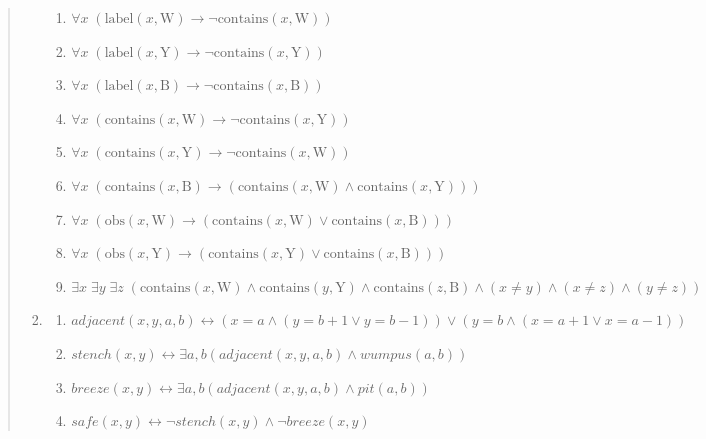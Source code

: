 \documentclass{article}
\theoremstyle{definition}
\newcommand{\<}{\langle}
\renewcommand{\>}{\rangle}
\begin{document}
\begin{enumerate}[label=\textbf{\arabic*.}]
\begin{quote}
\begin{enumerate}
      \begin{enumerate}
\item $\forall x \; (\text{label}(x, \text{W}) \rightarrow \lnot \text{contains}(x, \text{W}))$
\item $\forall x \; (\text{label}(x, \text{Y}) \rightarrow \lnot \text{contains}(x, \text{Y}))$
\item $\forall x \; (\text{label}(x, \text{B}) \rightarrow \lnot \text{contains}(x, \text{B}))$
\item $\forall x \; (\text{contains}(x, \text{W}) \rightarrow \lnot \text{contains}(x, \text{Y}))$
\item $\forall x \; (\text{contains}(x, \text{Y}) \rightarrow \lnot \text{contains}(x, \text{W}))$
\item $\forall x \; (\text{contains}(x, \text{B}) \rightarrow (\text{contains}(x, \text{W}) \land \text{contains}(x, \text{Y})))$
\item $\forall x \; (\text{obs}(x, \text{W}) \rightarrow (\text{contains}(x, \text{W}) \lor \text{contains}(x, \text{B})))$
\item $\forall x \; (\text{obs}(x, \text{Y}) \rightarrow (\text{contains}(x, \text{Y}) \lor \text{contains}(x, \text{B})))$
\item $\exists x \; \exists y \; \exists z \; (\text{contains}(x, \text{W}) \land \text{contains}(y, \text{Y}) \land \text{contains}(z, \text{B}) \land (x \neq y) \land (x \neq z) \land (y \neq z))$
      \end{enumerate}
      \vspace{0.5em}

    \item 
      \begin{enumerate}
        \item $adjacent(x,y,a,b) \leftrightarrow (x=a \land (y=b+1 \lor y=b-1)) \lor (y=b \land (x=a+1 \lor x=a-1))$
        \item $stench(x,y) \leftrightarrow \exists a,b(adjacent(x,y,a,b) \land wumpus(a,b))$
        \item $breeze(x,y) \leftrightarrow \exists a,b(adjacent(x,y,a,b) \land pit(a,b))$
        \item $safe(x,y) \leftrightarrow \lnot stench(x,y) \land \lnot breeze(x,y)$
      \end{enumerate}
      \vspace{0.5em}


\end{enumerate}
\end{quote}
\end{enumerate}
\end{document}
